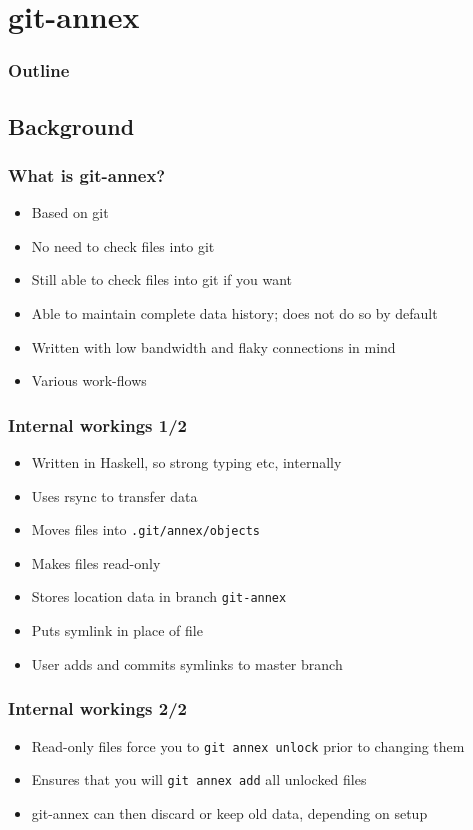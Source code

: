 \documentclass[t]{beamer}
\begin{document}
\section{git-annex}

\begin{frame}
	\frametitle{Outline}
	\tableofcontents[currentsection]
\end{frame}

\subsection{Background}

\begin{frame}
	\frametitle{What is git-annex?}
	\begin{itemize}
		\item Based on git
		\item No need to check files into git
		\item Still able to check files into git if you want
		\item Able to maintain complete data history; does not do so by default
		\item Written with low bandwidth and flaky connections in mind
		\item Various work-flows
	\end{itemize}
\end{frame}

\begin{frame}
	\frametitle{Internal workings 1/2}
	\begin{itemize}
		\item Written in Haskell, so strong typing etc, internally
		\item Uses rsync to transfer data
		\item Moves files into \texttt{.git/annex/objects}
		\item Makes files read-only
		\item Stores location data in branch \texttt{git-annex}
		\item Puts symlink in place of file
		\item User adds and commits symlinks to master branch
	\end{itemize}
\end{frame}

\begin{frame}
	\frametitle{Internal workings 2/2}
	\begin{itemize}
		\item Read-only files force you to \texttt{git annex unlock} prior to changing them
		\item Ensures that you will \texttt{git annex add} all unlocked files
		\item git-annex can then discard or keep old data, depending on setup
	\end{itemize}
\end{frame}
\end{document}
